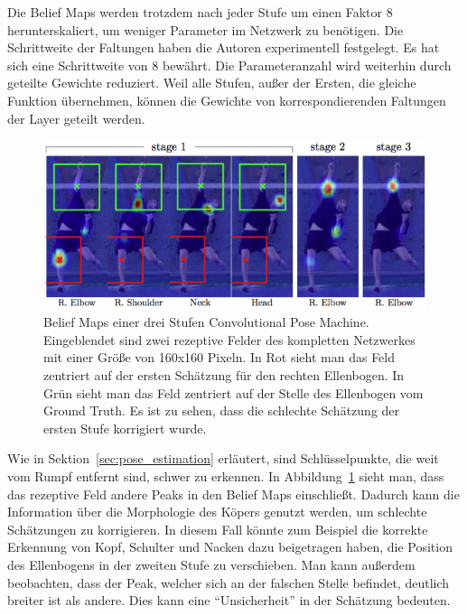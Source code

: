 \documentclass[journal, a4paper]{IEEEtran}
\begin{document}
        Die Belief Maps werden trotzdem nach jeder Stufe um einen Faktor 8 herunterskaliert, um weniger Parameter im Netzwerk zu benötigen. Die Schrittweite der Faltungen haben die Autoren experimentell festgelegt. Es hat sich eine Schrittweite von 8 bewährt. Die Parameteranzahl wird weiterhin durch geteilte Gewichte reduziert. Weil alle Stufen, außer der Ersten, die gleiche Funktion übernehmen, können die Gewichte von korrespondierenden Faltungen der Layer geteilt werden.

        \begin{figure}[!hbt]
                \begin{center}
                \includegraphics[width=1\columnwidth]{receptive_field.png}
                \caption{Belief Maps einer drei Stufen Convolutional Pose Machine. Eingeblendet sind zwei rezeptive Felder des kompletten Netzwerkes mit einer Größe von 160x160 Pixeln. In Rot sieht man das Feld zentriert auf der ersten Schätzung für den rechten Ellenbogen. In Grün sieht man das Feld zentriert auf der Stelle des Ellenbogen vom Ground Truth. Es ist zu sehen, dass die schlechte Schätzung der ersten Stufe korrigiert wurde.}
                \label{fig:receptive_field}
                \end{center}
        \end{figure}

        Wie in Sektion~\ref{sec:pose_estimation} erläutert, sind Schlüsselpunkte, die weit vom Rumpf entfernt sind, schwer zu erkennen. 
        In Abbildung~\ref{fig:receptive_field} sieht man, dass das rezeptive Feld andere Peaks in den Belief Maps einschließt. Dadurch kann die Information über die Morphologie des Köpers genutzt werden, um schlechte Schätzungen zu korrigieren. In diesem Fall könnte zum Beispiel die korrekte Erkennung von Kopf, Schulter und Nacken dazu beigetragen haben, die Position des Ellenbogens in der zweiten Stufe zu verschieben. Man kann außerdem beobachten, dass der Peak, welcher sich an der falschen Stelle befindet, deutlich breiter ist als andere. Dies kann eine "`Unsicherheit"' in der Schätzung bedeuten.
\end{document}
